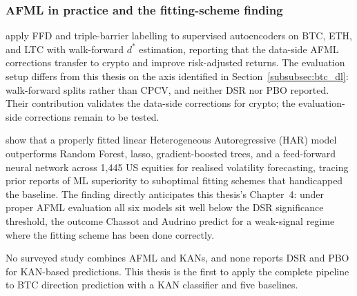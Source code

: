 \subsubsection{AFML in practice and the fitting-scheme finding}\label{subsubsec:afml_practice_gap}

\citet{slepaczuk_bieganowski_2024} apply FFD and triple-barrier labelling to supervised autoencoders on BTC, ETH, and LTC with walk-forward $d^*$ estimation, reporting that the data-side AFML corrections transfer to crypto and improve risk-adjusted returns. The evaluation setup differs from this thesis on the axis identified in Section~\ref{subsubsec:btc_dl}: walk-forward splits rather than CPCV, and neither DSR nor PBO reported. Their contribution validates the data-side corrections for crypto; the evaluation-side corrections remain to be tested.

\citet{chassot_audrino_2026} show that a properly fitted linear Heterogeneous Autoregressive (HAR) model \citep{corsi_2009} outperforms Random Forest, lasso, gradient-boosted trees, and a feed-forward neural network across 1,445 US equities for realised volatility forecasting, tracing prior reports of ML superiority to suboptimal fitting schemes that handicapped the baseline. The finding directly anticipates this thesis's Chapter~4: under proper AFML evaluation all six models sit well below the DSR significance threshold, the outcome Chassot and Audrino predict for a weak-signal regime where the fitting scheme has been done correctly.

No surveyed study combines AFML and KANs, and none reports DSR and PBO for KAN-based predictions. This thesis is the first to apply the complete pipeline to BTC direction prediction with a KAN classifier and five baselines.